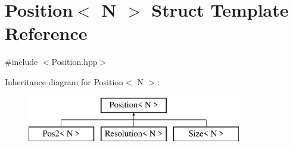 \hypertarget{struct_position}{\section{Position$<$ N $>$ Struct Template Reference}
\label{struct_position}
}


{\ttfamily \#include $<$Position.\-hpp$>$}

Inheritance diagram for Position$<$ N $>$\-:\begin{figure}[H]
\begin{center}
\leavevmode
\includegraphics[height=2.000000cm]{struct_position}
\end{center}
\end{figure}
